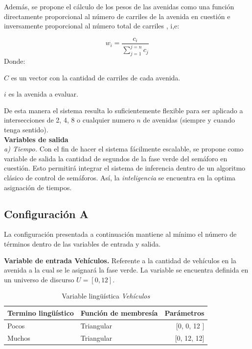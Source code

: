 Además, se propone el cálculo de los pesos de las avenidas como una función directamente proporcional al número de carriles de la avenida en cuestión e inversamente proporcional al número total de carriles , i,e:

\begin{displaymath}
w_i = \frac{ c_i }{\sum_{j=1}^{j=n} c_j}
\end{displaymath}
Donde:
{\setlength{\baselineskip}{0.7\baselineskip}\begin{description}
		\item $C$ es un vector con la cantidad de carriles de cada avenida.
		\item $i$ es la avenida a evaluar.
\end{description}}
De esta manera el sistema resulta lo suficientemente flexible para ser aplicado a intersecciones de 2, 4, 8 o cualquier numero $n$ de avenidas (siempre y cuando tenga sentido).\\

\textbf{Variables de salida}\\
\textit{a) Tiempo.} Con el fin de hacer el sistema fácilmente escalable, se propone como variable de salida la cantidad de segundos de la fase verde del semáforo en cuestión. Esto permitirá integrar el sistema de inferencia dentro de un algoritmo clásico de control de semáforos. Así, la \textit{inteligencia} se encuentra en la optima asignación de tiempos.

\newpage
\subsection{Configuración A}
La configuración presentada a continuación mantiene al mínimo el número de términos dentro de las variables de entrada y salida. 

\textbf{Variable de entrada Vehículos.} Referente a la cantidad de vehículos en la avenida a la cual se le asignará la fase verde. La variable se encuentra definida en un universo de discurso $U = [0,12]$.

\begin{table}[!h]
	\centering
	\begin{tabular}{llr} \toprule
		Termino lingüístico & Función de membresía & Parámetros \\ \midrule
		Pocos & Triangular & [0, 0, 12 ] \\
		Muchos & Triangular & [0, 12, 12] \\ \bottomrule
	\end{tabular}
	\caption{Variable lingüística \textit{Vehículos}}
\end{table}


